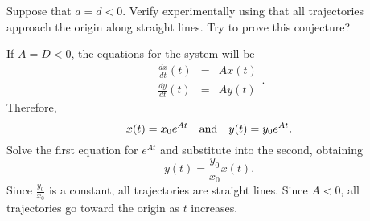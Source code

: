 \documentclass{ximera}
\begin{document}
\begin{computerExercise} \label{c3.4.6}
Suppose that $a=d<0$.  Verify experimentally using {\pplane}
that all trajectories approach the origin along straight lines.
Try to prove this conjecture?

\begin{solution}

If $A = D < 0$, the equations for the system will be
\[ \begin{array}{rcl}
\frac{dx}{dt}(t) & = & Ax(t) \\
\frac{dy}{dt}(t) & = & Ay(t)\end{array}. \]
Therefore,
\[ x(t) = x_0e^{At} \quad\mbox{and}\quad y(t) = y_0e^{At}. \]
Solve the first equation for $e^{At}$ and substitute into the
second, obtaining \[ y(t) = \frac{y_0}{x_0}x(t). \]
Since $\frac{y_0}{x_0}$ is a constant, all trajectories are
straight lines.  Since $A < 0$, all trajectories go toward the
origin as $t$ increases.

\end{solution}
\end{computerExercise}
\end{document}
